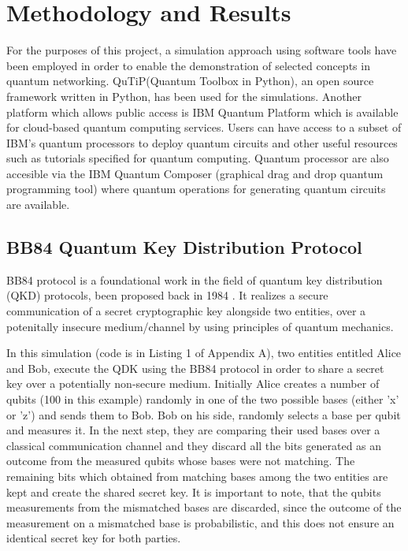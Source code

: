 	\chapter{Methodology and Results}
		
		For the purposes of this project, a
		simulation approach using software tools
		have been employed in order to enable the
		demonstration of selected concepts in quantum networking.
		QuTiP(Quantum Toolbox in Python)\cite{qutip}, an open source framework
		written in Python, has been used for the simulations.
		Another platform which allows public access is IBM Quantum Platform\cite{qiskit} which is available for cloud-based quantum computing services. 
		Users can have access to a subset of IBM's quantum processors to deploy quantum circuits 
		and other useful resources such as tutorials specified for quantum computing. Quantum processor are also accesible via the
		IBM Quantum Composer (graphical drag and drop quantum programming tool) where quantum operations for generating quantum circuits 
		are available.

		\section{BB84 Quantum Key Distribution Protocol}

		BB84 protocol is a foundational work in the field
		of quantum key distribution (QKD) protocols,
		been proposed back in 1984 \cite{bb84}.
		It realizes a secure communication of a secret cryptographic key
		alongside two entities, over a potenitally insecure medium/channel
		by using principles of quantum mechanics.
		
		In this simulation (code is in Listing 1 of Appendix A),
		two entities entitled Alice and Bob, execute the QDK using the BB84 protocol
		in order to share a secret key over a potentially non-secure medium. Initially Alice creates
		a number of qubits (100 in this example) randomly in one of the two possible bases (either 'x' or 'z') and sends them 
		to Bob. Bob on his side, randomly selects a base per qubit and measures it. In the next step, 
		they are comparing their used bases over a classical communication channel and 
		they discard all the bits generated as an outcome from the measured qubits whose bases were not matching.
		The remaining bits which obtained from matching bases among the two entities are kept and create the shared secret key.
		It is important to note, that the qubits measurements from the mismatched bases are 
		discarded, since the outcome of the measurement on a mismatched base is probabilistic,
		and this does not ensure an identical secret key for both parties.

